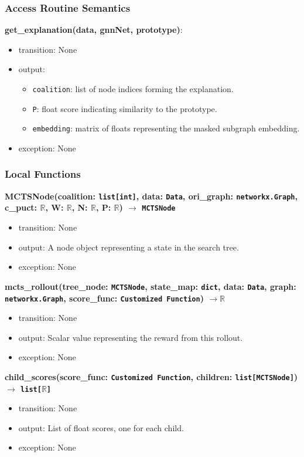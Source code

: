 \documentclass[12pt, titlepage]{article}
\begin{document}
\subsubsection{Access Routine Semantics}

\noindent \textbf{get\_explanation(data, gnnNet, prototype)}:
\begin{itemize}
  \item transition: None
  \item output:
  \begin{itemize}
    \item \texttt{coalition}: list of node indices forming the explanation.
    \item \texttt{P}: float score indicating similarity to the prototype.
    \item \texttt{embedding}: matrix of floats representing the masked subgraph embedding.
  \end{itemize}
  \item exception: None
\end{itemize}

\subsubsection{Local Functions}

\noindent 
\textbf{MCTSNode(coalition: \texttt{list[int]}, data: \texttt{Data}, ori\_graph: \texttt{networkx.Graph}, c\_puct: \(\mathbb{R}\), W: \(\mathbb{R}\), N: \(\mathbb{R}\), P: \(\mathbb{R}\)) \(\rightarrow\) \texttt{MCTSNode}}
\begin{itemize}
  \item transition: None
  \item output: A node object representing a state in the search tree.
  \item exception: None
\end{itemize}

\noindent 
\textbf{mcts\_rollout(tree\_node: \texttt{MCTSNode}, state\_map: \texttt{dict}, data: \texttt{Data}, graph: \texttt{networkx.Graph}, score\_func: \texttt{Customized Function}) \(\rightarrow \mathbb{R}\)}
\begin{itemize}
  \item transition: None
  \item output: Scalar value representing the reward from this rollout.
  \item exception: None
\end{itemize}

\noindent 
\textbf{child\_scores(score\_func: \texttt{Customized Function}, children: \texttt{list[MCTSNode]}) \(\rightarrow\) \texttt{list[\(\mathbb{R}\)]}}
\begin{itemize}
  \item transition: None
  \item output: List of float scores, one for each child.
  \item exception: None
\end{itemize}
\end{document}
